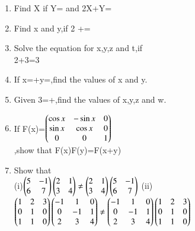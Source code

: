 \begin{enumerate}[label=\arabic*.,ref=\thesubsection.\theenumi]
(i)X+Y= and X-Y=\\
(ii)2X+3Y= and 3X+2Y=\\ 
\item Find X if Y= and 2X+Y=\\
\item Find x and y,if 2 +=\\
\item Solve the equation for x,y,z and t,if \\
2+3=3\\
\item If x=+y=,find the values of x and y.\\
\item Given 3=+,find the values of x,y,z and w.\\
\item If F(x)=$\begin{pmatrix}\cos x &-\sin x &0\\ \sin x &\cos x &0\\0 &0 &1\end{pmatrix}$\\,show that F(x)F(y)=F(x+y)\\
\item Show that\\
(i)$\begin{pmatrix}5 &-1\\6 &7\end{pmatrix}\begin{pmatrix}2 &1\\3 &4\end{pmatrix}\neq\begin{pmatrix}2 &1\\3 &4\end{pmatrix}\begin{pmatrix}5 &-1\\6 &7\end{pmatrix}$
(ii)$\begin{pmatrix}1 &2 &3\\0 &1 &0\\1 &1 &0\end{pmatrix}\begin{pmatrix}-1 &1 &0\\0 &-1 &1\\2 &3 &4\end{pmatrix}\neq \begin{pmatrix}-1 &1 &0\\0 &-1 &1\\2 &3 &4\end{pmatrix}\begin{pmatrix}1 &2 &3\\0 &1 &0\\1 &1 &0\end{pmatrix}$\\

\end{enumerate}

